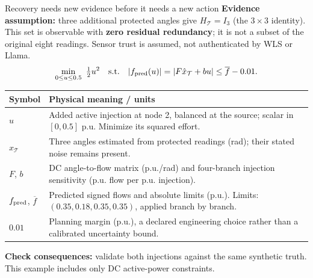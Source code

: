\begin{frame}[t]{Recovery needs new evidence before it needs a new action}
\footnotesize
\textbf{Evidence assumption:} three additional protected angles give $H_{\mathcal T}=I_3$ (the $3\times3$ identity). This set is observable with \textbf{zero residual redundancy}; it is not a subset of the original eight readings. Sensor trust is assumed, not authenticated by WLS or Llama.
\setlength{\abovedisplayskip}{4pt}\setlength{\belowdisplayskip}{4pt}\[
\min_{0\leq u\leq0.5}\ \tfrac12u^2
\quad\text{s.t.}\quad
|f_{\rm pred}(u)|=|F\hat x_{\mathcal T}+b u|\leq\overline f-0.01.
\]
\footnotesize
\renewcommand{\arraystretch}{1.0}
\begin{tabular}{@{}>{\raggedright\arraybackslash}p{.22\linewidth}>{\raggedright\arraybackslash}p{.70\linewidth}@{}}
\toprule Symbol & Physical meaning / units \\
\midrule
$u$ & Added active injection at node 2, balanced at the source; scalar in $[0,0.5]$ p.u. Minimize its squared effort. \\
$\hat x_{\mathcal T}$ & Three angles estimated from protected readings (rad); their stated noise remains present. \\
$F$, $b$ & DC angle-to-flow matrix (p.u./rad) and four-branch injection sensitivity (p.u. flow per p.u. injection). \\
$f_{\rm pred}$, $\overline f$ & Predicted signed flows and absolute limits (p.u.). Limits: $(0.35,0.18,0.35,0.35)$, applied branch by branch. \\
$0.01$ & Planning margin (p.u.), a declared engineering choice rather than a calibrated uncertainty bound. \\
\bottomrule
\end{tabular}
\par\textbf{Check consequences:} validate both injections against the same synthetic truth. This example includes only DC active-power constraints.
\end{frame}

